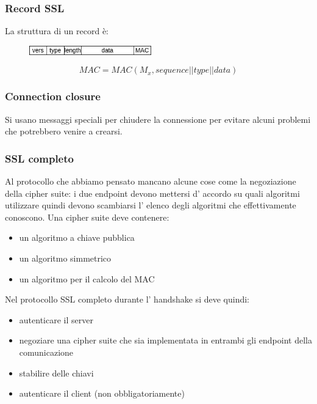 \subsubsection{Record SSL}
La struttura di un record è:
\begin{figure}[H]
    \centering
    \includegraphics[width=200px]{images/7_Security/ssl_record.png}
\end{figure}
$$ MAC = MAC(M_x, sequence||type||data) $$

\subsubsection{Connection closure}
Si usano messaggi speciali per chiudere la connessione per evitare alcuni problemi che potrebbero venire a crearsi.

\subsubsection{SSL completo}
Al protocollo che abbiamo pensato mancano alcune cose come la negoziazione della cipher suite: i due endpoint devono mettersi d' accordo su quali algoritmi utilizzare quindi devono scambiarsi l' elenco degli algoritmi che effettivamente conoscono.
Una cipher suite deve contenere:
\begin{itemize}
    \item un algoritmo a chiave pubblica
    \item un algoritmo simmetrico
    \item un algoritmo per il calcolo del MAC
\end{itemize}

Nel protocollo SSL completo durante l' handshake si deve quindi:
\begin{itemize}
    \item autenticare il server
    \item negoziare una cipher suite che sia implementata in entrambi gli endpoint della comunicazione
    \item stabilire delle chiavi
    \item autenticare il client (non obbligatoriamente)
\end{itemize}

